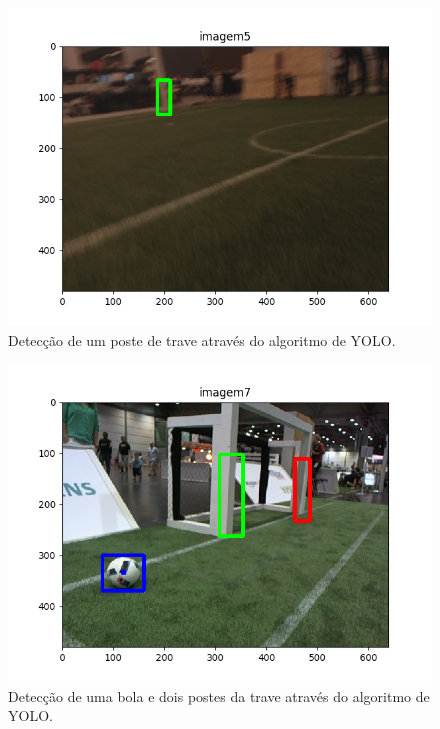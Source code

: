 \documentclass[conference]{IEEEtran}
\begin{document}
\begin{figure}[htbp]
\centering
\centerline{\includegraphics[scale=0.5]{imagens/imagem5_detection.png}}
\caption{Detecção de um poste de trave através do algoritmo de YOLO.}
\label{imagem5_detection}
\end{figure}


\begin{figure}[htbp]
\centering
\centerline{\includegraphics[scale=0.5]{imagens/imagem7_detection.png}}
\caption{Detecção de uma bola e dois postes da trave através do algoritmo de YOLO.}
\label{imagem7_detection}
\end{figure}
\end{document}

